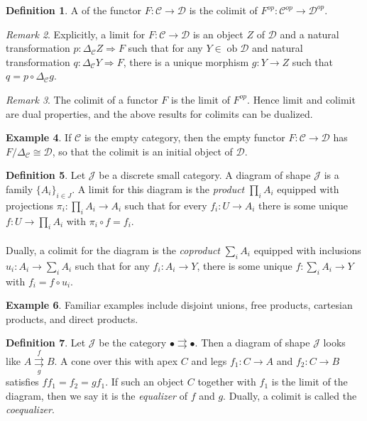\documentclass[10pt,letterpaper,cm]{nupset}
\theoremstyle{definition}
\newtheorem{definition}{Definition}
\newtheorem{exmp}[definition]{Example}
\theoremstyle{theorem}
\theoremstyle{remark}
\newtheorem{remark}[definition]{Remark}
\newcommand{\1}{\mathbf{1}}
\renewcommand{\c}{\mathscr{C}}
\renewcommand{\d}{\mathscr{D}}
\renewcommand{\j}{\mathscr{J}}
\newcommand{\0}{\vec 0}
\DeclareMathOperator{\ob}{ob}
\begin{document}
\begin{definition}
A  of the functor $F: \c \to \d$ is the colimit of $F^{op} : \c^{op} \to \d^{op}$.
\end{definition}

\begin{remark}
Explicitly,  a limit for $F: \c \to \d$ is an object $Z$ of $\d$ and a natural transformation $p: \Delta_{\c}Z \Rightarrow F$ such that for any $Y \in \ob \d$ and natural transformation $q: \Delta_{\c}Y \Rightarrow F$, there is a unique morphism $g: Y \to Z$ such that $ q= p \circ \Delta_{\c}g$.
\end{remark}

\begin{remark}
The colimit of a functor $F$ is the limit of $F^{op}$. Hence limit and colimit are dual properties, and the above results for colimits can be dualized.
\end{remark}

\begin{exmp}
If $\c$ is the empty category, then the empty functor $F: \c \to \d$ has $F/\Delta_{\c}\cong \d$, so that the colimit is an initial object of $\d$.
\end{exmp}

\begin{definition}
Let $\j$ be a discrete small category. A diagram of shape $\j$ is a family $\{A_i\}_{i\in J}$. A limit for this diagram is the \textit{product} $\prod_i A_i$ equipped with projections $\pi_i : \prod_i A_i \to A_i$ such that for every $f_{i} : U \to A_i$ there is some unique $f: U \to \prod_i A_i$ with $\pi_i \circ f = f_i$. 
\\ \\ Dually, a colimit for the diagram is the \textit{coproduct} $\sum_i A_i$ equipped with inclusions $u_i : A_i \to \sum_i A_i$ such that for any $f_i : A_i \to Y$, there is some unique $f : \sum_i A_i \to Y$ with $f_i = f \circ u_i$.
\end{definition}

\begin{exmp}
Familiar examples include disjoint unions, free products, cartesian products, and direct products. 
\end{exmp}

\begin{definition}
Let $\j$ be the category $\bullet \rightrightarrows \bullet$. Then  a diagram of shape $\j$ looks like $A \overset{f}{\underset{g}{\rightrightarrows}} B$. A cone over this with apex $C$ and legs $f_1 : C \to A$ and $f_2 : C \to B$ satisfies $ff_1=f_2 = gf_1$. If such an object $C$ together with $f_1$ is the limit of the diagram, then we say it is the \textit{equalizer} of $f$ and $g$. Dually, a colimit is called the \textit{coequalizer}.
\end{definition}
\end{document}
